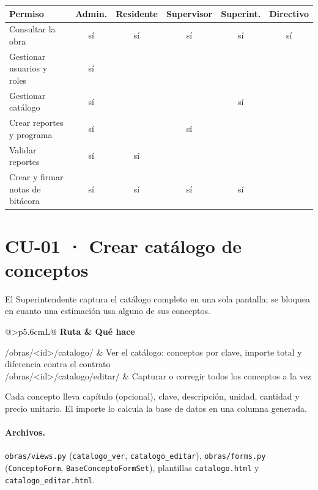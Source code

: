 \documentclass[11pt,letterpaper]{article}
\makeatletter
\newcommand{\cod}[1]{\texttt{\small #1}}
\newcommand{\rutas}[1]{%
\begin{center}\small\rowcolors{2}{grisfondo}{white}
\begin{tabularx}{\linewidth}{@{}>{\ttfamily\footnotesize}p{5.6cm}L@{}}
\toprule\normalfont\sffamily\bfseries Ruta & \sffamily\bfseries Qué hace\\\midrule
#1
\bottomrule\end{tabularx}\end{center}}
\makeatother
\begin{document}
\begin{center}\small{}
\begin{tabular}{@{}l*{5}{c}@{}}
\toprule\sffamily\bfseries Permiso & \sffamily\bfseries Admin. & \sffamily\bfseries Residente & \sffamily\bfseries Supervisor & \sffamily\bfseries Superint. & \sffamily\bfseries Directivo\\\midrule
Consultar la obra & sí & sí & sí & sí & sí\\
Gestionar usuarios y roles & sí & & & & \\
Gestionar catálogo & sí & & & sí & \\
Crear reportes y programa & sí & & sí & & \\
Validar reportes & sí & sí & & & \\
Crear y firmar notas de bitácora & sí & sí & sí & sí & \\
\bottomrule\end{tabular}\end{center}

\section{CU-01 · Crear catálogo de conceptos}
El Superintendente captura el catálogo completo en una sola pantalla; se bloquea en cuanto una estimación usa alguno de sus conceptos.

\rutas{
/obras/<id>/catalogo/ & Ver el catálogo: conceptos por clave, importe total y diferencia contra el contrato\\
/obras/<id>/catalogo/editar/ & Capturar o corregir todos los conceptos a la vez\\
}

Cada concepto lleva capítulo (opcional), clave, descripción, unidad, cantidad y precio unitario. El importe lo calcula la base de datos en una columna generada.

\paragraph{Archivos.} \cod{obras/views.py} (\cod{catalogo\_ver}, \cod{catalogo\_editar}), \cod{obras/forms.py} (\cod{ConceptoForm}, \cod{BaseConceptoFormSet}), plantillas \cod{catalogo.html} y \cod{catalogo\_editar.html}.
\end{document}
